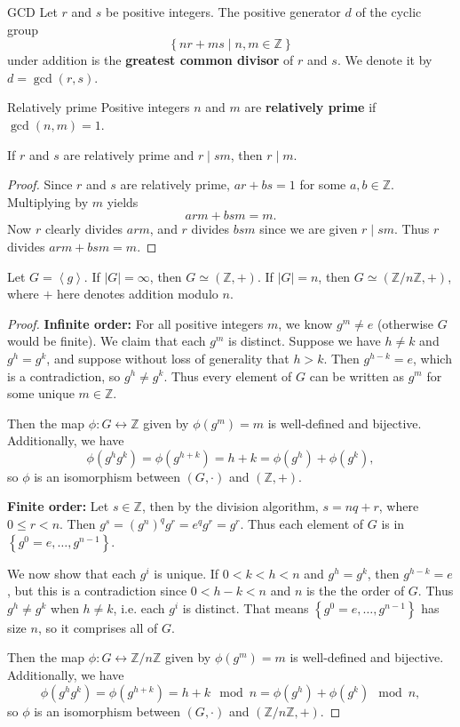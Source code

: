 \documentclass[10pt]{report}
\begin{document}
\begin{defn}{GCD}{}
Let $r$ and $s$ be positive integers. The positive generator $d$ of the cyclic group
\[
\left\{ nr+ms \;|\; n,m \in \mathbb{Z} \right\}
\] under addition is the \textbf{greatest common divisor} of $r$ and $s$. We denote it by $d = \gcd(r,s)$.
\end{defn}

\begin{defn}{Relatively prime}{}
	Positive integers $n$ and $m$ are \textbf{relatively prime} if $\gcd(n,m)=1$.
\end{defn}

\begin{prop}
	If $r$ and $s$ are relatively prime and $r \;|\; sm$, then $r \;|\; m$.
\end{prop}
\begin{proof}
	Since $r$ and $s$ are relatively prime, $ar+bs=1$ for some $a,b \in \mathbb{Z}$. Multiplying by $m$ yields
	\[
	arm + bsm = m.
	\] Now $r$ clearly divides $arm$, and $r$ divides $bsm$ since we are given $r \;|\; sm$. Thus $r$ divides $arm+bsm=m$.
\end{proof}

\begin{thrm}{}{}
	Let $G = \left\langle g \right\rangle$. If $|G| = \infty$, then $G \simeq (\mathbb{Z}, +)$. If $|G| = n$, then $G \simeq (\mathbb{Z}/n\mathbb{Z}, +)$, where $+$ here denotes addition modulo $n$.
\end{thrm}
\begin{proof}
	\textbf{Infinite order:} For all positive integers $m$, we know $g^m \neq e$ (otherwise $G$ would be finite). We claim that each $g^m$ is distinct. Suppose we have $h \neq k$ and $g^h = g^k$, and suppose without loss of generality that $h > k$. Then $g^{h-k}=e$, which is a contradiction, so $g^h \neq g^k$. Thus every element of $G$ can be written as $g^m$ for some unique $m \in \mathbb{Z}$.

	Then the map $\phi: G \leftrightarrow \mathbb{Z}$ given by $\phi(g^m) = m$ is well-defined and bijective. Additionally, we have
	\[
		\phi(g^hg^k) = \phi(g^{h+k}) = h+k = \phi(g^h) + \phi(g^k),
	\] so $\phi$ is an isomorphism between $(G, \cdot)$ and $(\mathbb{Z}, +)$.

	\textbf{Finite order:} Let $s \in \mathbb{Z}$, then by the division algorithm, $s = nq+r$, where $0 \leq r < n$. Then $g^{s}=(g^n)^q g^r = e^q g^r = g^r$. Thus each element of $G$ is in $\left\{ g^0=e, \dots, g^{n-1} \right\}$.

	We now show that each $g^i$ is unique. If $0 < k < h< n$ and $g^h=g^k$, then $g^{h-k}=e$, but this is a contradiction since $0 <h-k < n$ and $n$ is the the order of $G$. Thus $g^h \neq g^k$ when $h \neq k$, i.e. each $g^i$ is distinct. That means $\left\{ g^0=e, \dots, g^{n-1} \right\}$ has size $n$, so it comprises all of $G$.

	Then the map $\phi: G \leftrightarrow \mathbb{Z}/n\mathbb{Z}$ given by $\phi(g^m)=m$ is well-defined and bijective. Additionally, we have
	\[
		\phi(g^h g^k) = \phi(g^{h+k}) = h+k \mod n = \phi(g^h) + \phi(g^k) \mod n,
	\] so $\phi$ is an isomorphism between $(G, \cdot)$ and $(\mathbb{Z}/n\mathbb{Z}, +)$.
\end{proof}
\end{document}
